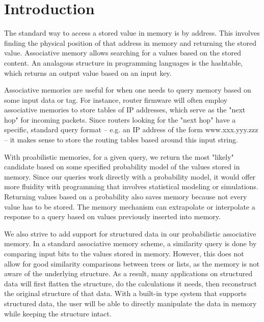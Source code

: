\documentclass{sig-alternate}
\begin{document}
\section{Introduction}
\label{sec:intro}

The standard way to access a stored value in memory is by address. 
This involves finding the physical position of that address in memory
and returning the stored value. Associative memory allows
searching for a values based on the stored content. An analagous structure
in programming languages is the hashtable, which returns an output value
based on an input key. 

Associative memories are useful for when one needs to query memory based 
on some input data or tag. For instance, router firmware will often employ associative 
memories to store tables of IP addresses, which serve as the "next hop" for incoming 
packets. Since routers looking for the "next hop" have a specific, standard query 
format -- e.g. an IP address of the form www.xxx.yyy.zzz -- it makes sense to store the 
routing tables based around this input string.

With proabilistic memories, for a given query, we return the most "likely" candidate 
based on some specified probability model of the values stored in memory. 
Since our queries work directly with a probability model, it would offer more fluidity
with programming that involves statistical modeling or simulations. Returning values
based on a probability also saves memory because not every value has to be stored. The 
memory mechanism can extrapolate or interpolate a response to a query based on values 
previously inserted into memory. 

We also strive to add support for structured data in our probabilistic associative memory.
In a standard associative memory scheme, a similarity query is done by comparing input bits
to the values stored in memory. However, this does not allow for good similarity comparisons
between trees or lists, as the memory is not aware of the underlying structure. As a result,
many applications on structured data will first flatten the structure, do the calculations
it needs, then reconstruct the original structure of that data. With a built-in type system
that supports structured data, the user will be able to directly manipulate the data in memory 
while keeping the structure intact.
\end{document}
